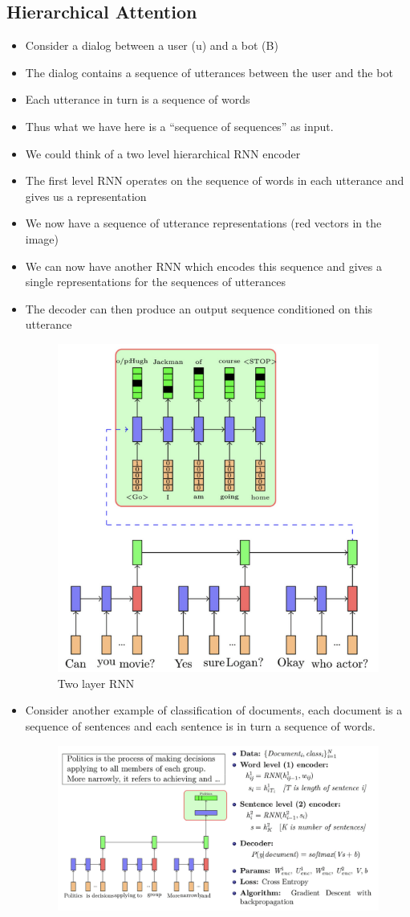 \documentclass[a4paper]{article}
\begin{document}
\subsection{Hierarchical Attention}
\begin{itemize}
    \item Consider a dialog between a user (u) and a bot (B)
    \item The dialog contains a sequence of utterances between the user and the bot
    \item Each utterance in turn is a sequence of words
    \item Thus what we have here is a “sequence of sequences” as input.
    \item We could think of a two level hierarchical RNN encoder
    \item The first level RNN operates on the sequence of words in each utterance and gives us a representation
    \item We now have a sequence of utterance representations (red vectors in the image)
    \item We can now have another RNN which encodes this sequence and gives a single representations for the sequences of utterances
    \item The decoder can then produce an output sequence conditioned on this utterance
    \begin{figure}[H]
        \centering
        \includegraphics[width=0.5\linewidth]{Degree//static/DL_2_layer_RNN.png}
        \caption{Two layer RNN}
    \end{figure}
    \item Consider another example of classification of documents, each document is a sequence of sentences and each sentence is in turn a sequence of words.
    \begin{figure}[H]
        \centering
        \includegraphics[width=0.8\linewidth]{Degree//static/DL_document_classification.png}

\end{figure}
\end{itemize}
\end{document}
